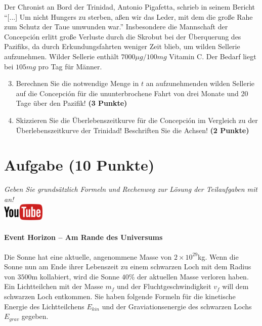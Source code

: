 \documentclass[a4paper, 9pt]{scrartcl}\usepackage[]{graphicx}\usepackage[]{xcolor}
\begin{document}
Der Chronist an Bord der Trinidad, Antonio Pigafetta, schrieb in seinem
Bericht "`[...] Um nicht Hungers zu sterben, a{\ss}en wir das Leder, mit dem
die gro{\ss}e Rahe zum Schutz der Taue umwunden war."' Insbesondere die
Mannschaft der Concepci{\'o}n erlitt gro{\ss}e Verluste durch die Skrobut bei der
{\"U}berquerung des Pazifiks, da durch Erkundungsfahrten weniger Zeit blieb, um
wilden Sellerie aufzunehmen. Wilder Sellerie enth{\"a}lt
$7000\mu g/100mg$ Vitamin C. Der Bedarf liegt bei
$105mg$ pro Tag f{\"u}r M{\"a}nner.

\begin{enumerate}
  \setcounter{enumi}{2}
\item Berechnen Sie die notwendige Menge in $t$ an
  aufzunehmenden wilden Sellerie auf die Concepci{\'o}n f{\"u}r die ununterbrochene
  Fahrt von drei Monate und 20 Tage {\"u}ber den Pazifik!
  \textbf{(3 Punkte)}
\item Skizzieren Sie die {\"U}berlebenszeitkurve f{\"u}r die Concepci{\'o}n im
  Vergleich zu der {\"U}berlebenszeitkurve der Trinidad! Beschriften Sie die
  Achsen! \textbf{(2 Punkte)}
\end{enumerate}

 
\clearpage

\section{Aufgabe \hfill (10 Punkte)}

\textit{Geben Sie grunds{\"a}tzlich Formeln und Rechenweg zur L{\"o}sung der
  Teilaufgaben mit an!} \\[1Ex]

\hfill\href{https://youtu.be/q-qYK4Chslg}{\includegraphics[width =
  2cm]{img/youtube}} %
\hspace{2Ex}

\paragraph{Event Horizon -- Am Rande des Universums}



Die Sonne hat eine aktuelle, angenommene Masse von $\ensuremath{2\times 10^{29}}$kg. Wenn
die Sonne nun am Ende ihrer Lebenszeit zu einem schwarzen Loch mit dem
Radius von $3500$m kollabiert, wird die Sonne $40$\%
der aktuellen Masse verloren haben. Ein Lichtteilchen mit der Masse $m_f$
und der Fluchtgeschwindigkeit $v_f$ will dem schwarzen Loch entkommen.  Sie
haben folgende Formeln f{\"u}r die kinetische Energie des Lichtteilchens
$E_{kin}$ und der Graviationsenergie des schwarzen Lochs $E_{grav}$
gegeben.
\end{document}
